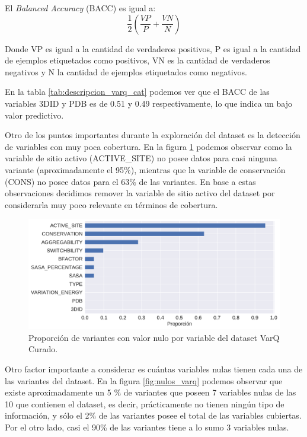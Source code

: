 El \textit{Balanced Accuracy} (BACC) es igual a:
\begin{equation*}
    \frac{1}{2} (\frac{VP}{P} + \frac{VN}{N})
\end{equation*}

Donde VP es igual a la cantidad de verdaderos positivos, P es igual a la cantidad de ejemplos etiquetados como positivos, VN es la cantidad de verdaderos negativos y N la cantidad de ejemplos etiquetados como negativos.

En la tabla \ref{tab:descripcion_varq_cat} podemos ver que el BACC de las variables 3DID y PDB es de 0.51 y 0.49 respectivamente, lo que indica un bajo valor predictivo. 

Otro de los puntos importantes durante la exploración del dataset es la detección de variables con muy poca cobertura. En la figura \ref{fig:proporcion_nulos_varq} podemos observar como la variable de sitio activo (ACTIVE\_SITE) no posee datos para casi ninguna variante (aproximadamente el 95\%), mientras que la variable de conservación (CONS) no posee datos para el 63\% de las variantes. En base a estas observaciones decidimos remover la variable de sitio activo del dataset por considerarla muy poco relevante en términos de cobertura.

\begin{figure}[H]
    \centering
    \includegraphics[scale=0.6]{documents/latex/figures/3/varq/proporcion_nulos.pdf}
    \caption{Proporción de variantes con valor nulo por variable del dataset VarQ Curado.}
    \label{fig:proporcion_nulos_varq}
\end{figure}

Otro factor importante a considerar es cuántas variables nulas tienen cada una de las variantes del dataset. En la figura \ref{fig:nulos_varq} podemos observar que existe aproximadamente un 5 \% de variantes que poseen 7 variables nulas de las 10 que contienen el dataset, es decir, prácticamente no tienen ningún tipo de información, y sólo el 2\% de las variantes posee el total de las variables cubiertas. Por el otro lado, casi el 90\% de las variantes tiene a lo sumo 3 variables nulas.

